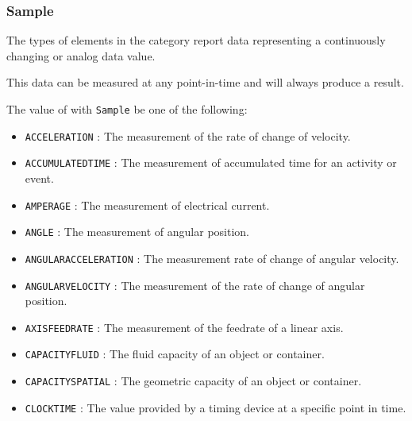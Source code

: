 \FloatBarrier

\subsubsection{Sample}
  \label{sec:Sample}



The types of  elements in the  category report data representing a continuously changing or analog data value.

This data can be measured at any point-in-time and will always produce a result.


The value of  with  \texttt{Sample} \MUST be one of the following:
\begin{itemize}

\item \texttt{ACCELERATION} : The measurement of the rate of change of velocity. 

\item \texttt{ACCUMULATED\textunderscore TIME} : The measurement of accumulated time for an activity or event. 

\item \texttt{AMPERAGE} : The measurement of electrical current. 

\item \texttt{ANGLE} : The measurement of angular position. 

\item \texttt{ANGULAR\textunderscore ACCELERATION} : The measurement rate of change of angular velocity. 

\item \texttt{ANGULAR\textunderscore VELOCITY} : The measurement of the rate of change of angular position. 

\item \texttt{AXIS\textunderscore FEEDRATE} : The measurement of the feedrate of a linear axis. 

\item \texttt{CAPACITY\textunderscore FLUID} : The fluid capacity of an object or container. 

\item \texttt{CAPACITY\textunderscore SPATIAL} : The geometric capacity of an object or container. 

\item \texttt{CLOCK\textunderscore TIME} : The value provided by a timing device at a specific point in time. 


\end{itemize}
